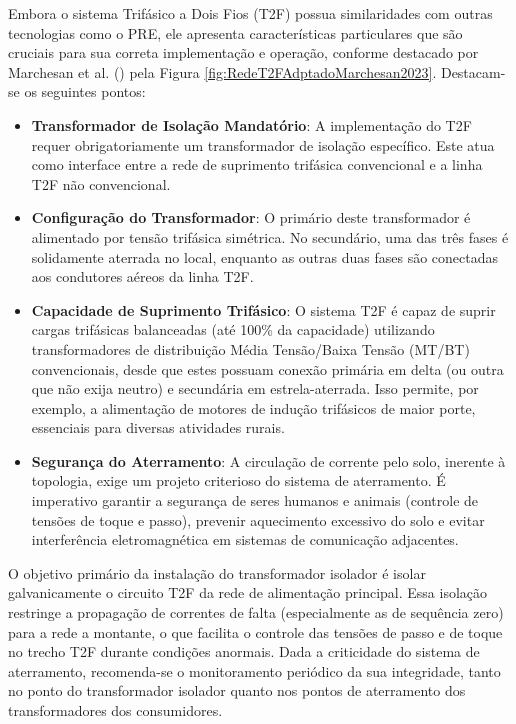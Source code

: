 \documentclass[oneside,openright,12pt]{ufsm_2021} %
\begin{document}
\par Embora o sistema Trifásico a Dois Fios (T2F) possua similaridades com outras tecnologias como o PRE, ele apresenta características particulares que são cruciais para sua correta implementação e operação, conforme destacado por Marchesan et al. (\citeyear{marchesan_three-phase-two-wire_2023}) pela Figura \ref{fig:RedeT2FAdptadoMarchesan2023}. Destacam-se os seguintes pontos:

\begin{itemize}
	\item \textbf{Transformador de Isolação Mandatório}: A implementação do T2F requer obrigatoriamente um transformador de isolação específico. Este atua como interface entre a rede de suprimento trifásica convencional e a linha T2F não convencional.
	\item \textbf{Configuração do Transformador}: O primário deste transformador é alimentado por tensão trifásica simétrica. No secundário, uma das três fases é solidamente aterrada no local, enquanto as outras duas fases são conectadas aos condutores aéreos da linha T2F.
	\item \textbf{Capacidade de Suprimento Trifásico}: O sistema T2F é capaz de suprir cargas trifásicas balanceadas (até 100\% da capacidade) utilizando transformadores de distribuição Média Tensão/Baixa Tensão (MT/BT) convencionais, desde que estes possuam conexão primária em delta (ou outra que não exija neutro) e secundária em estrela-aterrada. Isso permite, por exemplo, a alimentação de motores de indução trifásicos de maior porte, essenciais para diversas atividades rurais.
	\item \textbf{Segurança do Aterramento}: A circulação de corrente pelo solo, inerente à topologia, exige um projeto criterioso do sistema de aterramento. É imperativo garantir a segurança de seres humanos e animais (controle de tensões de toque e passo), prevenir aquecimento excessivo do solo e evitar interferência eletromagnética em sistemas de comunicação adjacentes.
\end{itemize} 

\par O objetivo primário da instalação do transformador isolador é isolar galvanicamente o circuito T2F da rede de alimentação principal. Essa isolação restringe a propagação de correntes de falta (especialmente as de sequência zero) para a rede a montante, o que facilita o controle das tensões de passo e de toque no trecho T2F durante condições anormais. Dada a criticidade do sistema de aterramento, recomenda-se o monitoramento periódico da sua integridade, tanto no ponto do transformador isolador quanto nos pontos de aterramento dos transformadores dos consumidores.
\end{document}
